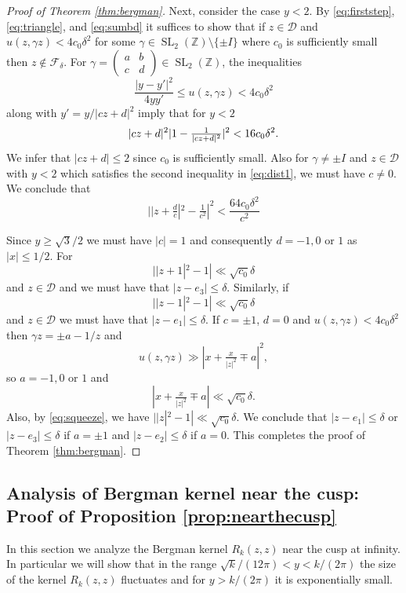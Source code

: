 \documentclass[12pt, a4paper]{amsart}
\newcommand{\tmop}[1]{\ensuremath{\operatorname{#1}}}
\theoremstyle{definition}
\newcommand {\1} {\mathbf{1}}
\newcommand {\Dc} {\mathcal{D}}
\numberwithin{equation}{section}
\begin{document}
\begin{proof}[Proof of Theorem \ref{thm:bergman}]
Next, consider the case $y <2$. By \eqref{eq:firststep}, \eqref{eq:triangle}, and \eqref{eq:sumbd} it suffices to show that if $z \in \Dc$ and $u(z,\gamma z) < 4 c_0 \delta^2$ for some $\gamma \in \tmop{SL}_2(\mathbb Z)\setminus\{\pm I\}$  where $c_0$ is sufficiently small then $z \notin \mathcal F_{\delta}$. For $\gamma =\begin{pmatrix}
a & b \\
c & d
\end{pmatrix} \in \tmop{SL}_2(\mathbb Z)$,
the inequalities
\begin{equation} \label{eq:dist1}
\frac{|y-y'|^2}{4yy'} \le u(z,\gamma z) < 4 c_0 \delta^2
\end{equation}
along with $y'=y/|cz+d|^2$ imply that for $y<2$
\begin{equation} \notag
|cz+d|^2 |1-\tfrac{1}{|cz+d|^2}|^2 < 16 c_0 \delta^2.
\end{equation}
We infer that $|cz+d| \le 2$ since $c_0$ is sufficiently small. Also for $\gamma \neq \pm I$ and $z \in \Dc$ with $y <2$ which satisfies the second inequality in \eqref{eq:dist1}, we must have $c \neq 0$. We conclude that
\begin{equation} \label{eq:squeeze}
||z+\tfrac{d}{c}|^2-\tfrac{1}{c^2}|^2 <  \frac{ 64 c_0 \delta^2}{c^2}
\end{equation}


Since $y \ge \sqrt{3}/2$ we must have $|c|=1$ and consequently $d=-1,0$ or $1$ as $|x| \le 1/2$. For $$||z+1|^2-1| \ll \sqrt{c_0} \delta$$ and $z \in \Dc$ and we must have that $|z-e_3| \le \delta$. Similarly, if
$$||z-1|^2-1| \ll \sqrt{c_0} \delta$$ and $z \in \Dc$ we must have that $|z-e_1| \le \delta$.  If $c=\pm 1$, $d=0$ and  $u(z,\gamma z) < 4c_0 \delta^2$ then $\gamma z=\pm a-1/z$ and
$$u(z,\gamma z) \gg |x+\tfrac{x}{|z|^2} \mp a|^2,$$ so $a=-1,0$ or $1$ and $$|x+\tfrac{x}{|z|^2} \mp a| \ll \sqrt{c_0} \delta.$$
Also, by \eqref{eq:squeeze}, we have $||z|^2-1| \ll \sqrt{c_0} \delta$. We conclude that $|z-e_1| \le \delta$ or $|z-e_3|\le \delta$ if $a=\pm 1$ and $|z-e_2|\le \delta$ if $a=0$. This completes the proof of Theorem \ref{thm:bergman}.
\end{proof}

\subsection{Analysis of Bergman kernel near the cusp: Proof of Proposition \ref{prop:nearthecusp}}

In this section we analyze the Bergman kernel $R_k(z,z)$ near the cusp at infinity. In particular we will show that in the range $\sqrt{k}/(12\pi)< y <k/(2\pi)$ the size of the kernel $R_k(z,z)$ fluctuates and for $y>k/(2\pi)$ it is exponentially small.
\end{document}
